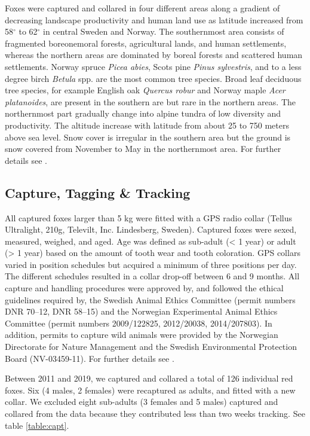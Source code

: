 Foxes were captured and collared in four different areas along a gradient of decreasing landscape productivity and human land use as latitude increased from 58$^{\circ}$ to 62$^{\circ}$ in central Sweden and Norway. The southernmost area consists of fragmented boreonemoral forests, agricultural lands, and human settlements, whereas the northern  areas are dominated by boreal forests and scattered human settlements. Norway spruce \emph{Picea abies}, Scots pine \emph{Pinus sylvestris}, and to a less degree birch \emph{Betula} spp. are the most common tree species. Broad leaf deciduous tree species, for example English oak \emph{Quercus robur} and Norway maple \emph{Acer platanoides}, are present in the southern are but rare in the northern areas. The northernmost part gradually change into alpine tundra of low diversity and productivity. The altitude increase with latitude from about 25 to 750 meters above sea level. Snow cover is irregular in the southern area but the ground is snow covered from November to May in the northernmost area. For further details see \citet{waltonVariationHomeRange2017}.

\subsection*{Capture, Tagging \& Tracking}

All captured foxes larger than 5 kg were fitted with a GPS radio collar (Tellus Ultralight, 210g, Televilt, Inc. Lindesberg, Sweden). Captured foxes were sexed, measured, weighed, and aged. Age was defined as sub-adult (< 1 year) or adult (> 1 year) based on the amount of tooth wear and tooth coloration. GPS collars varied in position schedules but acquired a minimum of three positions per day. The different schedules resulted in a collar drop-off between 6 and 9 months. All capture and handling procedures were approved by, and followed the ethical guidelines required by, the Swedish Animal Ethics Committee (permit numbers DNR 70–12, DNR 58–15) and the Norwegian Experimental Animal Ethics Committee (permit numbers 2009/122825, 2012/20038, 2014/207803). In addition, permits to capture wild animals were provided by the Norwegian Directorate for Nature Management and the Swedish Environmental Protection Board (NV-03459-11). For further details see \citep{waltonVariationHomeRange2017,waltonLongdistanceDispersalRed2018}.

Between 2011 and 2019, we captured and collared a total of 126 individual red foxes. Six (4 males, 2 females) were recaptured as adults, and fitted with a new collar. We excluded eight sub-adults (3 females and 5 males) captured and collared from the data because they contributed less than two weeks tracking. See table \ref{table:capt}. 

